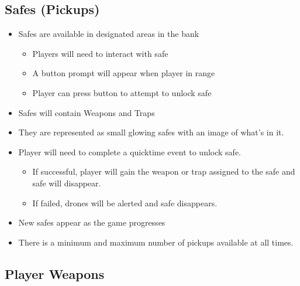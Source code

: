 \documentclass[10pt]{report}
\begin{document}
\subsection{Safes (Pickups)}

\begin{itemize}
    \item Safes are available in designated areas in the bank
    \begin{itemize}
        \item Players will need to interact with safe
        \item A button prompt will appear when player in range
        \item Player can press button to attempt to unlock safe
    \end{itemize}
    \item Safes will contain Weapons and Traps
    \item They are represented as small glowing safes with an image of what’s in it.
    \item Player will need to complete a quicktime event to unlock safe.
    \begin{itemize}
        \item If successful, player will gain the weapon or trap assigned to the safe and safe will disappear.
        \item If failed, drones will be alerted and safe disappears.
    \end{itemize}
    \item New safes appear as the game progresses
    \item There is a minimum and maximum number of pickups available at all times.    
\end{itemize}

\subsection{Player Weapons}
\end{document}

